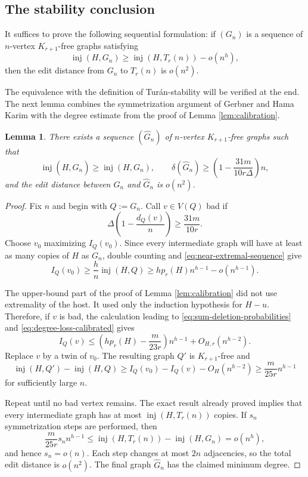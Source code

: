 \documentclass[11pt]{article}
\numberwithin{equation}{section}
\newtheorem{lemma}[theorem]{Lemma}
\theoremstyle{definition}
\theoremstyle{remark}
\newcommand{\inj}{\operatorname{inj}}
\begin{document}
\subsection{The stability conclusion}

It suffices to prove the following sequential formulation: if $(G_n)$ is a sequence of $n$-vertex $K_{r+1}$-free graphs satisfying
\begin{equation}
\label{eq:near-extremal-sequence}
\inj(H,G_n)\ge \inj(H,T_r(n))-o(n^h),
\end{equation}
then the edit distance from $G_n$ to $T_r(n)$ is $o(n^2)$.

The equivalence with the definition of Tur\'an-stability will be verified at the end. The next lemma combines the symmetrization argument of Gerbner and Hama Karim \cite{GerbnerHamaKarim} with the degree estimate from the proof of Lemma \ref{lem:calibration}.

\begin{lemma}
\label{lem:cleaning}
There exists a sequence $(\widehat G_n)$ of $n$-vertex $K_{r+1}$-free graphs such that
\[
\inj(H,\widehat G_n)\ge \inj(H,G_n),\qquad
\delta(\widehat G_n)\ge \left(1-\frac{31m}{10r\Delta}\right)n,
\]
and the edit distance between $G_n$ and $\widehat G_n$ is $o(n^2)$.
\end{lemma}

\begin{proof}
Fix $n$ and begin with $Q:=G_n$. Call $v\in V(Q)$ bad if
\[
\Delta\left(1-\frac{d_Q(v)}n\right)\ge \frac{31m}{10r}.
\]
Choose $v_0$ maximizing $I_Q(v_0)$. Since every intermediate graph will have at least as many copies of $H$ as $G_n$, double counting and \eqref{eq:near-extremal-sequence} give
\[
I_Q(v_0)\ge \frac{h}{n}\inj(H,Q)
\ge hp_r(H)n^{h-1}-o(n^{h-1}).
\]

The upper-bound part of the proof of Lemma \ref{lem:calibration} did not use extremality of the host. It used only the induction hypothesis for $H-u$. Therefore, if $v$ is bad, the calculation leading to \eqref{eq:sum-deletion-probabilities} and \eqref{eq:degree-loss-calibrated} gives
\[
I_Q(v)\le \left(hp_r(H)-\frac{m}{23r}\right)n^{h-1}+O_{H,r}(n^{h-2}).
\]
Replace $v$ by a twin of $v_0$. The resulting graph $Q'$ is $K_{r+1}$-free and
\[
\inj(H,Q')-\inj(H,Q)\ge I_Q(v_0)-I_Q(v)-O_H(n^{h-2})\ge \frac{m}{25r}n^{h-1}
\]
for sufficiently large $n$.

Repeat until no bad vertex remains. The exact result already proved implies that every intermediate graph has at most $\inj(H,T_r(n))$ copies. If $s_n$ symmetrization steps are performed, then
\[
\frac{m}{25r}s_n n^{h-1}
\le \inj(H,T_r(n))-\inj(H,G_n)=o(n^h),
\]
and hence $s_n=o(n)$. Each step changes at most $2n$ adjacencies, so the total edit distance is $o(n^2)$. The final graph $\widehat G_n$ has the claimed minimum degree.
\end{proof}
\end{document}
